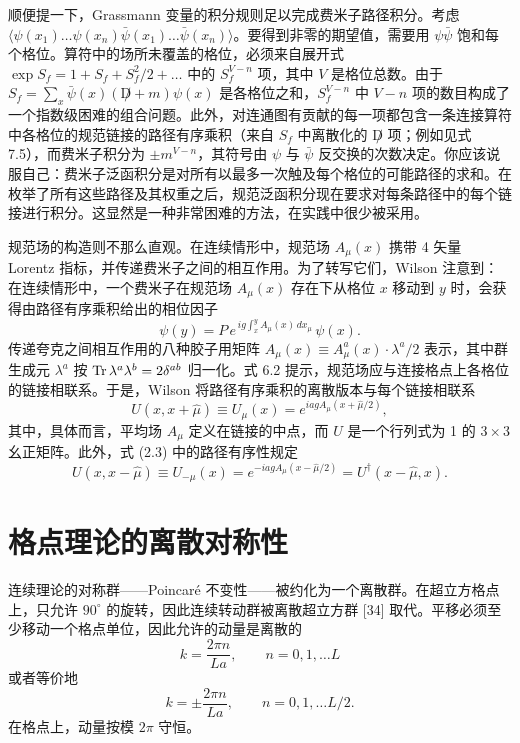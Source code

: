 顺便提一下，Grassmann 变量的积分规则足以完成费米子路径积分。考虑 \(\langle \psi(x_1) \ldots\allowbreak \psi(x_n)\bar{\psi}(x_1) \ldots\allowbreak \bar{\psi}(x_n) \rangle\)。要得到非零的期望值，需要用 \(\psi\bar{\psi}\) 饱和每个格位。算符中的场所未覆盖的格位，必须来自展开式 \(\exp S_f = 1 + S_f + S_f^2/2 + \ldots\) 中的 \(S_f^{V-n}\) 项，其中 \(V\) 是格位总数。由于 \(S_f = \sum_x \bar{\psi}(x)(\not D + m)\psi(x)\) 是各格位之和，\(S_f^{V-n}\) 中 \(V-n\) 项的数目构成了一个指数级困难的组合问题。此外，对连通图有贡献的每一项都包含一条连接算符中各格位的规范链接的路径有序乘积（来自 \(S_f\) 中离散化的 \(\not D\) 项；例如见式 7.5），而费米子积分为 \(\pm m^{V-n}\)，其符号由 \(\psi\) 与 \(\bar{\psi}\) 反交换的次数决定。你应该说服自己：费米子泛函积分是对所有以最多一次触及每个格位的可能路径的求和。在枚举了所有这些路径及其权重之后，规范泛函积分现在要求对每条路径中的每个链接进行积分。这显然是一种非常困难的方法，在实践中很少被采用。

规范场的构造则不那么直观。在连续情形中，规范场 \(A_\mu(x)\) 携带 4 矢量 Lorentz 指标，并传递费米子之间的相互作用。为了转写它们，Wilson 注意到：在连续情形中，一个费米子在规范场 \(A_\mu(x)\) 存在下从格位 \(x\) 移动到 \(y\) 时，会获得由路径有序乘积给出的相位因子
\begin{equation}
\psi(y) = P\, e^{\,ig\int_x^y A_\mu(x)\,dx_\mu}\, \psi(x) .
\end{equation}
传递夸克之间相互作用的八种胶子用矩阵 \(A_\mu(x) \equiv A_\mu^a(x) \cdot \lambda^a/2\) 表示，其中群生成元 \(\lambda^a\) 按 \(\Tr \lambda^a \lambda^b = 2\delta^{ab}\) 归一化。式 6.2 提示，规范场应与连接格点上各格位的链接相联系。于是，Wilson 将路径有序乘积的离散版本与每个链接相联系
\begin{equation}
U(x, x+\hat{\mu}) \equiv U_\mu(x) = e^{iagA_\mu(x+\hat{\mu}/2)} ,
\end{equation}
其中，具体而言，平均场 \(A_\mu\) 定义在链接的中点，而 \(U\) 是一个行列式为 1 的 \(3 \times 3\) 幺正矩阵。此外，式 (2.3) 中的路径有序性规定
\begin{equation}
U(x, x-\hat{\mu}) \equiv U_{-\mu}(x) = e^{-iagA_\mu(x-\hat{\mu}/2)} = U^\dagger(x - \hat{\mu}, x) .
\end{equation}

\section{格点理论的离散对称性}

连续理论的对称群——Poincar\'e 不变性——被约化为一个离散群。在超立方格点上，只允许 \(90^\circ\) 的旋转，因此连续转动群被离散超立方群 [34] 取代。平移必须至少移动一个格点单位，因此允许的动量是离散的
\[
k = \frac{2\pi n}{La}, \qquad n = 0, 1, \ldots L
\]
或者等价地
\[
k = \pm \frac{2\pi n}{La}, \qquad n = 0, 1, \ldots L/2 .
\]
在格点上，动量按模 \(2\pi\) 守恒。

